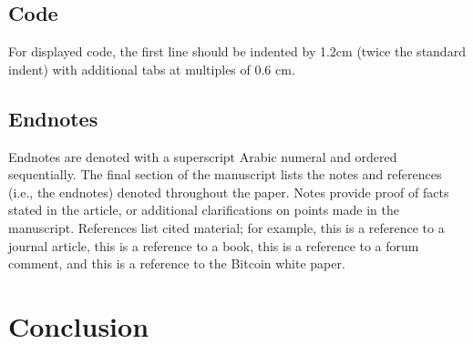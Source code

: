\documentclass{ledger}
\begin{document}



\subsection{Code}

For displayed code, the first line should be indented by 1.2cm (twice the standard indent) with additional tabs at multiples of 0.6 cm.

\subsection{Endnotes}

Endnotes are denoted with a superscript Arabic numeral and ordered sequentially.  The final section of the manuscript lists the notes and references (i.e., the endnotes) denoted throughout the paper.  Notes provide proof of facts stated in the article, or additional clarifications on points made in the manuscript.  References list cited material; for example, this is a reference to a journal article, this is a reference to a book, this is a reference to a forum comment, and this is a reference to the Bitcoin white paper.

\section{Conclusion}
\end{document}
